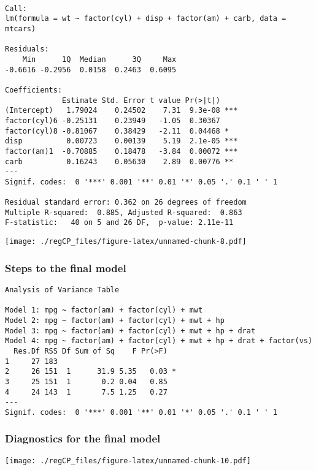 \documentclass[5pt,]{article}
\begin{document}
\begin{verbatim}

Call:
lm(formula = wt ~ factor(cyl) + disp + factor(am) + carb, data = mtcars)

Residuals:
    Min      1Q  Median      3Q     Max 
-0.6616 -0.2956  0.0158  0.2463  0.6095 

Coefficients:
             Estimate Std. Error t value Pr(>|t|)    
(Intercept)   1.79024    0.24502    7.31  9.3e-08 ***
factor(cyl)6 -0.25131    0.23949   -1.05  0.30367    
factor(cyl)8 -0.81067    0.38429   -2.11  0.04468 *  
disp          0.00723    0.00139    5.19  2.1e-05 ***
factor(am)1  -0.70885    0.18478   -3.84  0.00072 ***
carb          0.16243    0.05630    2.89  0.00776 ** 
---
Signif. codes:  0 '***' 0.001 '**' 0.01 '*' 0.05 '.' 0.1 ' ' 1

Residual standard error: 0.362 on 26 degrees of freedom
Multiple R-squared:  0.885, Adjusted R-squared:  0.863 
F-statistic:   40 on 5 and 26 DF,  p-value: 2.11e-11
\end{verbatim}

\texttt{[image: ./regCP\_files/figure-latex/unnamed-chunk-8.pdf]}

\subsubsection{Steps to the final model}\label{steps-to-the-final-model}

\begin{verbatim}
Analysis of Variance Table

Model 1: mpg ~ factor(am) + factor(cyl) + mwt
Model 2: mpg ~ factor(am) + factor(cyl) + mwt + hp
Model 3: mpg ~ factor(am) + factor(cyl) + mwt + hp + drat
Model 4: mpg ~ factor(am) + factor(cyl) + mwt + hp + drat + factor(vs)
  Res.Df RSS Df Sum of Sq    F Pr(>F)  
1     27 183                           
2     26 151  1      31.9 5.35   0.03 *
3     25 151  1       0.2 0.04   0.85  
4     24 143  1       7.5 1.25   0.27  
---
Signif. codes:  0 '***' 0.001 '**' 0.01 '*' 0.05 '.' 0.1 ' ' 1
\end{verbatim}

\subsubsection{Diagnostics for the final
model}\label{diagnostics-for-the-final-model}

\texttt{[image: ./regCP\_files/figure-latex/unnamed-chunk-10.pdf]}
\end{document}
